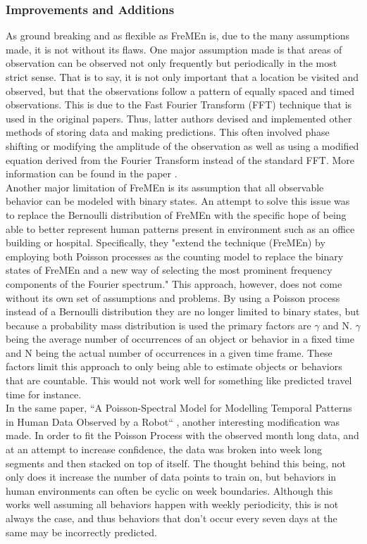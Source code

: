   \subsubsection{ Improvements and Additions }

  As ground breaking and as flexible as FreMEn is, due to the many assumptions
  made, it is not without its flaws. One major assumption made is that areas of
  observation can be observed not only frequently but periodically in the most
  strict sense. That is to say, it is not only important that a location be
  visited and observed, but that the observations follow a pattern of equally
  spaced and timed observations. This is due to the Fast Fourier Transform (FFT)
  technique that is used in the original papers. Thus, latter authors devised and
  implemented other methods of storing data and making predictions. This often
  involved phase shifting or modifying the amplitude of the observation as well
  as using a modified equation derived from the Fourier Transform instead of the
  standard FFT. More information can be found in the paper \cite{Santos2016}. \\

  Another major limitation of FreMEn is its assumption that all observable
  behavior can be modeled with binary states. An  attempt to solve this issue
  was to replace the Bernoulli distribution of FreMEn with the specific hope of
  being able to better represent human patterns present in environment such as
  an office building or hospital. Specifically, they "extend the technique
  (FreMEn) by employing both Poisson processes as the counting model to replace
  the binary states of FreMEn and a new way of selecting the most prominent
  frequency components of the Fourier spectrum."\cite{Jovan2016} This approach,
  however, does not come without its own set of assumptions and problems. By
  using a Poisson process instead of a Bernoulli distribution they are no longer
  limited to binary states, but because a probability mass distribution is used
  the primary factors are $\gamma$ and N. $\gamma$ being the average number of
  occurrences of an object or behavior in a fixed time and N being the actual
  number of occurrences in a given time frame. These factors limit this
  approach to only being able to estimate objects or behaviors that are
  countable. This would not work well for something like predicted travel time
  for instance. \\

  In the same paper,
  ``A Poisson-Spectral Model for Modelling Temporal Patterns in Human Data Observed by a Robot``
  \cite{Jovan2016}, another interesting modification was made. In order to fit
  the Poisson Process with the observed month long data, and at an attempt to
  increase confidence, the data was broken into week long segments and then
  stacked on top of itself. The thought behind this being, not only does it
  increase the number of data points to train on, but behaviors in human
  environments can often be cyclic on week boundaries. Although this works well
  assuming all behaviors happen with weekly periodicity, this is not always
  the case, and thus behaviors that don't occur every seven days at the same
  may be incorrectly predicted.

